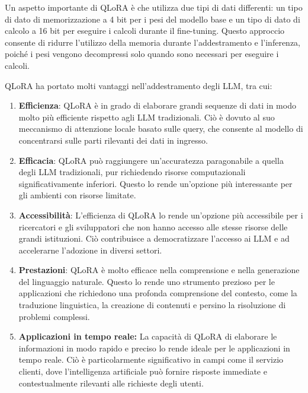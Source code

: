 Un aspetto importante di QLoRA è che utilizza due tipi di dati differenti: un tipo di dato di memorizzazione a 4 bit per i pesi del modello base e un tipo di dato di calcolo a 16 bit per eseguire i calcoli durante il fine-tuning. Questo approccio consente di ridurre l'utilizzo della memoria durante l'addestramento e l'inferenza, poiché i pesi vengono decompressi solo quando sono necessari per eseguire i calcoli.




QLoRA ha portato molti vantaggi nell'addestramento degli LLM, tra cui:

\begin{enumerate}[label=\alph*.]
    \item \textbf{Efficienza}: QLoRA è in grado di elaborare grandi sequenze di dati in modo molto più efficiente rispetto agli LLM tradizionali. Ciò è dovuto al suo meccanismo di attenzione locale basato sulle query, che consente al modello di concentrarsi sulle parti rilevanti dei dati in ingresso.
    
    \item \textbf{Efficacia}: QLoRA può raggiungere un'accuratezza paragonabile a quella degli LLM tradizionali, pur richiedendo risorse computazionali significativamente inferiori. Questo lo rende un'opzione più interessante per gli ambienti con risorse limitate.
    
    \item \textbf{Accessibilità}: L'efficienza di QLoRA lo rende un'opzione più accessibile per i ricercatori e gli sviluppatori che non hanno accesso alle stesse risorse delle grandi istituzioni. Ciò contribuisce a democratizzare l'accesso ai LLM e ad accelerarne l'adozione in diversi settori.
    
    \item \textbf{Prestazioni}: QLoRA è molto efficace nella comprensione e nella generazione del linguaggio naturale. Questo lo rende uno strumento prezioso per le applicazioni che richiedono una profonda comprensione del contesto, come la traduzione linguistica, la creazione di contenuti e persino la risoluzione di problemi complessi.
    
    \item \textbf{Applicazioni in tempo reale:} La capacità di QLoRA di elaborare le informazioni in modo rapido e preciso lo rende ideale per le applicazioni in tempo reale. Ciò è particolarmente significativo in campi come il servizio clienti, dove l'intelligenza artificiale può fornire risposte immediate e contestualmente rilevanti alle richieste degli utenti.


\end{enumerate}

